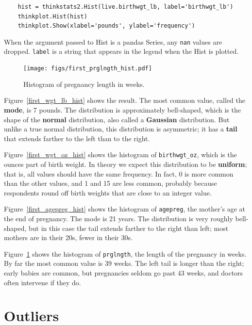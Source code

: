 \documentclass[12pt]{book}
\theoremstyle{exercise}
\begin{document}
\begin{verbatim}
    hist = thinkstats2.Hist(live.birthwgt_lb, label='birthwgt_lb')
    thinkplot.Hist(hist)
    thinkplot.Show(xlabel='pounds', ylabel='frequency')
\end{verbatim}

When the argument passed to Hist is a pandas Series, any
{\tt nan} values are dropped.  {\tt label} is a string that appears
in the legend when the Hist is plotted.%
%
%
%

\begin{figure}
\centerline{\texttt{[image: figs/first\_prglngth\_hist.pdf]}}
\caption{Histogram of pregnancy length in weeks.}%
\label{first_prglngth_hist}
\end{figure}

Figure~\ref{first_wgt_lb_hist} shows the result.  The most common
value, called the {\bf mode}, is 7 pounds.  The distribution is
approximately bell-shaped, which is the shape of the {\bf normal}
distribution, also called a {\bf Gaussian} distribution.  But unlike a
true normal distribution, this distribution is asymmetric; it has
a {\bf tail} that extends farther to the left than to the right.

Figure~\ref{first_wgt_oz_hist} shows the histogram of
\verb"birthwgt_oz", which is the ounces part of birth weight.  In
theory we expect this distribution to be {\bf uniform}; that is, all
values should have the same frequency.  In fact, 0 is more common than
the other values, and 1 and 15 are less common, probably because
respondents round off birth weights that are close to an integer
value.%
%

Figure~\ref{first_agepreg_hist} shows the histogram of \verb"agepreg",
the mother's age at the end of pregnancy.  The mode is 21 years.  The
distribution is very roughly bell-shaped, but in this case the tail
extends farther to the right than left; most mothers are in
their 20s, fewer in their 30s.

Figure~\ref{first_prglngth_hist} shows the histogram of
\verb"prglngth", the length of the pregnancy in weeks.  By far the
most common value is 39 weeks.  The left tail is longer than the
right; early babies are common, but pregnancies seldom go past 43
weeks, and doctors often intervene if they do.%


\section{Outliers}
\end{document}
